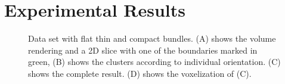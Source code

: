 \section {Experimental Results}
\label {sec:results}
%	

\begin{figure}[t]
\centering
	\caption{Data set with flat thin and compact bundles. (A) shows the volume rendering and a 2D slice with one of the boundaries marked in green, (B) shows the clusters according to individual orientation. (C) shows the complete result. (D) shows the voxelization of (C).}
	\label{fig:prepreg}
\end{figure}


